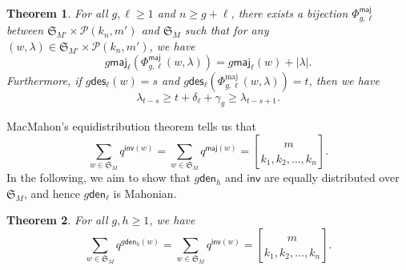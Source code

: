 \documentclass[12pt]{article}
\numberwithin{equation}{section}
\theoremstyle{plain}
\newtheorem{theorem}{Theorem}[section]
\def\des{\mathsf{des}}
\def\maj{\mathsf{maj}}
\def\den{\mathsf{den}}
\def\inv{\mathsf{inv}}
\begin{document}
 
  \begin{theorem}\label{th-Phi-maj}
 	For all $g, \ell\geq 1$ and  $n\geq g+\ell$,   there exists  a bijection $\Phi^{\maj}_{g, \ell}$ between $\mathfrak{S}_{M'}\times \mathcal{P}(k_n, m')$ and  $ \mathfrak{S}_{M}$  such that for any $(w, \lambda)\in   \mathfrak{S}_{M'}\times  \mathcal{P}(k_n, m')$,   we have 
 	\begin{equation}\label{eq-Phi1}
 		g\maj_\ell(\Phi^{\maj}_{g, \ell}(w, \lambda))=g\maj_{\ell}(w)+|\lambda|.
 	\end{equation}
 	Furthermore,  if $g\des_{\ell}(w)=s$ and $g\des_{\ell}(\Phi^{\mathrm{maj}}_{g, \ell}(w, \lambda))=t$, then  we have
 	\begin{equation}\label{eq-Phi2}
 		\lambda_{t-s}\geq t+\delta_\ell+\gamma_g \geq \lambda_{t-s+1}.
 	\end{equation} 
 \end{theorem}
 MacMahon's equidistribution theorem \cite{Mac}  tells us that
 \begin{equation}\label{eq-invmaj}
 	\sum\limits_{w\in \mathfrak{S}_M}  q^{\inv(w)}=\sum\limits_{w\in \mathfrak{S}_M}q^{\maj(w)}={m\brack k_1,k_2,\ldots,k_n}. 
 \end{equation}
  In the following, we aim to show that $g\den_h$ and $\inv$ are equally distributed over $\mathfrak{S}_{M}$, and hence $g\den_{\ell}$ is Mahonian. 
  \begin{theorem}
  	For all $g,h\geq 1$, we have
  	\begin{equation}\label{eq-mah}
  		\sum_{w\in \mathfrak{S}_{M}}q^{g\den_h(w)}=\sum_{w\in \mathfrak{S}_{M}}q^{\inv(w)}={m\brack k_1,k_2,\ldots,k_n}.
  	\end{equation}
  \end{theorem}
\end{document}
